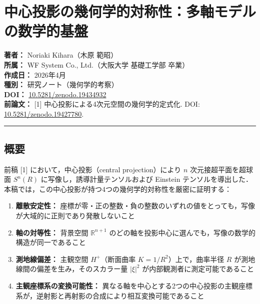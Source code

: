 \documentclass[a4paper,11pt]{ltjsarticle}
\theoremstyle{definition}
\providecommand{\tightlist}{\setlength{\itemsep}{0pt}\setlength{\parskip}{0pt}}
\begin{document}
\section{中心投影の幾何学的対称性：多軸モデルの数学的基盤}\label{ux4e2dux5fc3ux6295ux5f71ux306eux5e7eux4f55ux5b66ux7684ux5bfeux79f0ux6027ux591aux8ef8ux30e2ux30c7ux30ebux306eux6570ux5b66ux7684ux57faux76e4}

\textbf{著者：} Noriaki Kihara（木原 範昭）\\
\textbf{所属：} WF System Co., Ltd.（大阪大学 基礎工学部 卒業）\\
\textbf{作成日：} 2026年4月\\
\textbf{種別：} 研究ノート（幾何学的考察）\\
\textbf{DOI：} \href{https://doi.org/10.5281/zenodo.19434932}{10.5281/zenodo.19434932}\\
\textbf{前論文：} {[}1{]} 中心投影による4次元空間の幾何学的定式化. DOI: \href{https://doi.org/10.5281/zenodo.19427780}{10.5281/zenodo.19427780}.

\begin{center}\rule{0.5\linewidth}{0.5pt}\end{center}

\subsection{概要}\label{ux6982ux8981}

前稿 {[}1{]} において，中心投影（central projection）により \(n\) 次元接超平面を超球面 \(S^n(R)\) に写像し，誘導計量テンソルおよび Einstein テンソルを導出した．本稿では，この中心投影が持つ4つの幾何学的対称性を厳密に証明する：

\begin{enumerate}
\def\labelenumi{\arabic{enumi}.}
\tightlist
\item
  \textbf{離散安定性：} 座標が零・正の整数・負の整数のいずれの値をとっても，写像が大域的に正則であり発散しないこと
\item
  \textbf{軸の対等性：} 背景空間 \(\mathbb{R}^{n+1}\) のどの軸を投影中心に選んでも，写像の数学的構造が同一であること
\item
  \textbf{測地線偏差：} 主観空間 \(H^+\)（断面曲率 \(K = 1/R^2\)）上で，曲率半径 \(R\) が測地線間の偏差を生み，そのスカラー量 \(|\xi|^2\) が内部観測者に測定可能であること
\item
  \textbf{主観座標系の変換可能性：} 異なる軸を中心とする2つの中心投影の主観座標系が，逆射影と再射影の合成により相互変換可能であること
\end{enumerate}
\end{document}
